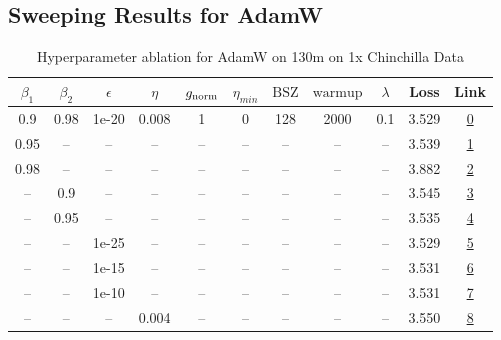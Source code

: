 \subsection{Sweeping Results for AdamW}%
\begin{table}[H]
\centering
\caption{Hyperparameter ablation for AdamW on 130m on 1x Chinchilla Data}
\label{tab:ablation_adamw_130m_on_1x_chinchilla_data}
\begin{tabular}{ccccccccccc}
\toprule
$\beta_1$ & $\beta_2$ & $\epsilon$ & $\eta$ & $g_{\mathrm{norm}}$ & $\eta_{min}$ & $\mathrm{BSZ}$ & $\mathrm{warmup}$ & $\lambda$ & Loss & Link \\
\midrule
0.9 & 0.98 & 1e-20 & 0.008 & 1 & 0 & 128 & 2000 & 0.1 & 3.529 & \href{https://wandb.ai/marin-community/optimizer-scaling/runs/sweep-130m-2B-adamw5098e9lr0.008-wd0.1-minlr0-warmup2000-b10.9-b-bc5e36}{0} \\
\midrule
0.95 & -- & -- & -- & -- & -- & -- & -- & -- & 3.539 & \href{https://wandb.ai/marin-community/optimizer-scaling/runs/sweep-130m-2B-adamw6b5e10lr0.008-wd0.1-minlr0-warmup2000-b10.95--b1de93}{1} \\
0.98 & -- & -- & -- & -- & -- & -- & -- & -- & 3.882 & \href{https://wandb.ai/marin-community/optimizer-scaling/runs/sweep-130m-2B-adamwae7d4dlr0.008-wd0.1-minlr0-warmup2000-b10.98--df53b1}{2} \\
-- & 0.9 & -- & -- & -- & -- & -- & -- & -- & 3.545 & \href{https://wandb.ai/marin-community/optimizer-scaling/runs/sweep-130m-2B-adamw5a9f1blr0.008-wd0.1-minlr0-warmup2000-b10.9-b-691bb8}{3} \\
-- & 0.95 & -- & -- & -- & -- & -- & -- & -- & 3.535 & \href{https://wandb.ai/marin-community/optimizer-scaling/runs/sweep-130m-2B-adamwb5ba64lr0.008-wd0.1-minlr0-warmup2000-b10.9-b-77d771}{4} \\
-- & -- & 1e-25 & -- & -- & -- & -- & -- & -- & 3.529 & \href{https://wandb.ai/marin-community/optimizer-scaling/runs/sweep-130m-2B-adamw0848aelr0.008-wd0.1-minlr0-warmup2000-b10.9-b-413f11}{5} \\
-- & -- & 1e-15 & -- & -- & -- & -- & -- & -- & 3.531 & \href{https://wandb.ai/marin-community/optimizer-scaling/runs/sweep-130m-2B-adamwca195dlr0.008-wd0.1-minlr0-warmup2000-b10.9-b-1f0e34}{6} \\
-- & -- & 1e-10 & -- & -- & -- & -- & -- & -- & 3.531 & \href{https://wandb.ai/marin-community/optimizer-scaling/runs/sweep-130m-2B-adamwb41b46lr0.008-wd0.1-minlr0-warmup2000-b10.9-b-0cf15c}{7} \\
-- & -- & -- & 0.004 & -- & -- & -- & -- & -- & 3.550 & \href{https://wandb.ai/marin-community/optimizer-scaling/runs/sweep-130m-2B-adamw79cde5lr0.004-wd0.1-minlr0-warmup2000-b10.9-b-019ae3}{8} \\

\end{tabular}
\end{table}
